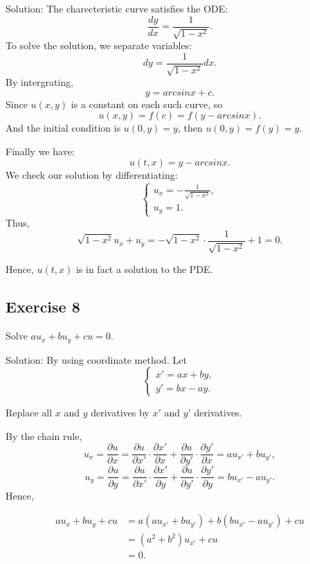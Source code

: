 \documentclass{article}
\begin{document}
            Solution: The charecteristic curve satisfies the ODE: 
            \[ \frac{dy}{dx}=\frac{1}{\sqrt{1-x^2}}.\]
			To solve the solution, we separate variables: 		
			\[ dy=\frac{1}{\sqrt{1-x^2}}dx.\]
			By intergrating, \[y= arcsinx + c .\]
			Since $u(x,y)$ is a constant on each such curve, so
			\[ u(x,y)=f(c)=f(y - arcsinx).\]
			And the initial condition is $u(0,y)=y$, then $u(0,y)=f(y)=y.$

			Finally we have:
			\[u(t,x)=y - arcsinx.\]
			We check our solution by differentiating:
			\begin{equation*}
				\begin{cases}
					u_x=-\frac{1}{\sqrt{1-x^2}},
					\\
					u_y=1.
				\end{cases}
			\end{equation*}
			Thus, \[\sqrt{1-x^2}u_x+u_y=-\sqrt{1-x^2} \cdot \frac{1}{\sqrt{1-x^2}}+1=0.\]

			Hence, $u(t,x)$ is in fact a solution to the PDE.


		\subsection{Exercise 8}
		Solve $au_x+bu_y+cu=0.$
		
		Solution:
		By using coordinate method. Let 
		\begin{equation*}
			\begin{cases}
				x'=ax+by,
				\\
				y'=bx-ay.
			\end{cases}
		\end{equation*}

		Replace all $x$ and $y$ derivatives by $x'$ and $y'$ derivatives.

		By the chain rule, \[u_x=\frac{\partial u}{\partial x}=\frac{\partial u}{\partial x'}\cdot\frac{\partial x'}{\partial x}+\frac{\partial u}{\partial y'}\cdot\frac{\partial y'}{\partial x}=au_{x'}+bu_{y'},\]
		\[u_y=\frac{\partial u}{\partial y}=\frac{\partial u}{\partial x'}\cdot\frac{\partial x'}{\partial y}+\frac{\partial u}{\partial y'}\cdot\frac{\partial y'}{\partial y}=bu_{x'}-au_{y'}.\]
		Hence,

		\begin{equation*}
			\begin{aligned}
			au_x+bu_y+cu&=
			a\left(au_{x'}+bu_{y'} \right)+b\left(bu_{x'}-au_{y'}\right)+cu\\
			&=\left(a^2+b^2\right)u_{x'}+cu\\
			&=0.
			\end{aligned}
		\end{equation*}
\end{document}
